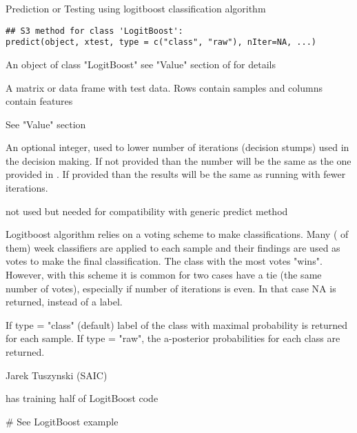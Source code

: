 \begin{Description}\relax
Prediction or Testing using logitboost classification algorithm
\end{Description}
\begin{Usage}
\begin{verbatim}## S3 method for class 'LogitBoost':
predict(object, xtest, type = c("class", "raw"), nIter=NA, ...)\end{verbatim}
\end{Usage}
\begin{Arguments}
\begin{ldescription}
\item[\code{object}] An object of class "LogitBoost" see "Value" section of 
 for details
\item[\code{xtest}] A matrix or data frame with test data. Rows contain samples 
and columns contain features
\item[\code{type}] See "Value" section
\item[\code{nIter}] An optional integer, used to lower number of iterations 
(decision stumps) used in the decision making. If not provided than the 
number will be the same as the one provided in . 
If provided than the results will be the same as running 
 with fewer iterations. 
\item[\code{...}] not used but needed for compatibility with generic predict 
method
\end{ldescription}
\end{Arguments}
\begin{Details}\relax
Logitboost algorithm relies on a voting scheme to make classifications. Many
( of them) week classifiers are applied to each sample and their
findings are used as votes to make the final classification. The class with 
the most votes "wins". However, with this scheme it is common for two cases 
have a tie (the same number of votes), especially if number of iterations is 
even. In that case NA is returned, instead of a label.
\end{Details}
\begin{Value}
If type = "class" (default) label of the class with maximal probability is 
returned for each sample. If type = "raw", the a-posterior probabilities for 
each class are returned.
\end{Value}
\begin{Author}\relax
Jarek Tuszynski (SAIC) 
\end{Author}
\begin{SeeAlso}\relax
{} has training half of LogitBoost code
\end{SeeAlso}
\begin{Examples}
\begin{ExampleCode}# See LogitBoost example\end{ExampleCode}
\end{Examples}

